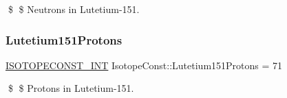 \$ \$ Neutrons in Lutetium-\/151. \mbox{\label{group___isotope_const-_lutetium-_lu151_gaa51454e7aacfa0a498d1179e874179e3}} 
\subsubsection{\texorpdfstring{Lutetium151\+Protons}{Lutetium151Protons}}
{\footnotesize\ttfamily \mbox{\hyperlink{group___isotope_const-_macros_ga5f18360b3e99483a35c32d789e62621c}{I\+S\+O\+T\+O\+P\+E\+C\+O\+N\+S\+T\+\_\+\+I\+NT}} Isotope\+Const\+::\+Lutetium151\+Protons = 71}

\$ \$ Protons in Lutetium-\/151. 